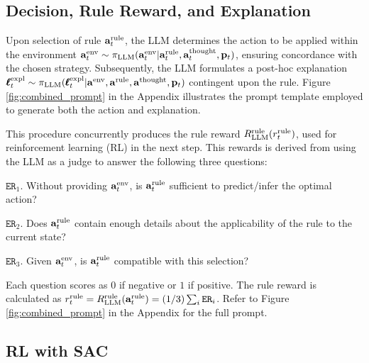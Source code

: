 \subsection{Decision, Rule Reward, and Explanation} \label{sec:rulerew}
Upon selection of rule ${\mathbf{a}}^{\text{rule}}_t$, the LLM determines the action to be applied within the environment ${\mathbf{a}}^{\text{env}}_t \sim \pi_{\textrm{LLM}}({\mathbf{a}}^{\text{env}}_t | {\mathbf{a}}^{\text{rule}}_t, {\mathbf{a}}^{\text{thought}}_t, {\mathbf{p}}_t)$, ensuring concordance with the chosen strategy. Subsequently, the LLM formulates a post-hoc explanation $\pmb{\ell}^{\text{expl}}_t \sim \pi_{\textrm{LLM}}(\pmb{\ell}^{\text{expl}}_t | {\mathbf{a}}^{\text{env}}, {\mathbf{a}}^{\text{rule}}, {\mathbf{a}}^{\text{thought}}, {\mathbf{p}}_t)$ contingent upon the rule. Figure \ref{fig:combined_prompt} in the Appendix illustrates the prompt template employed to generate both the action and explanation. 

This procedure concurrently produces the rule reward $R^{\text{rule}}_{\textrm{LLM}}(r^{\text{rule}}_t)$, used for reinforcement learning (RL) in the next step. This rewards is derived from using the LLM as a judge to answer the following three questions:

$\texttt{ER}_1$. Without providing ${\mathbf{a}}^{\text{env}}_t$, is ${\mathbf{a}}^{\text{rule}}_t$ sufficient to predict/infer the optimal action?

$\texttt{ER}_2$. Does ${\mathbf{a}}^{\text{rule}}_t$ contain enough details about the applicability of the rule to the current state?

$\texttt{ER}_3$. Given ${\mathbf{a}}^{\text{env}}_t$, is ${\mathbf{a}}^{\text{rule}}_t$ compatible with this selection?

Each question scores as $0$ if negative or $1$ if positive. The rule reward is calculated as $r_t^\text{rule}=R^{\text{rule}}_{\textrm{LLM}}({\mathbf{a}}^{\text{rule}}_t)=(1/3)\sum_i \texttt{ER}_i$. Refer to Figure \ref{fig:combined_prompt} in the Appendix for the full prompt.
 


\subsection{RL with SAC}\label{sec:sac-rl}

